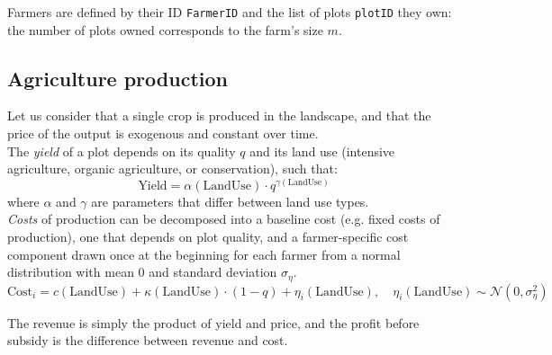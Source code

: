 \documentclass{article}
\begin{document}
\noindent Farmers are defined by their ID \texttt{FarmerID} and the list of plots \texttt{plotID} they own: the number of plots owned corresponds to the farm's size $m$. 

\subsection{Agriculture production}

Let us consider that a single crop is produced in the landscape, and that the price of the output is exogenous and constant over time. \\

\noindent The \emph{yield} of a plot depends on its quality $q$ and its land use (intensive agriculture, organic agriculture, or conservation), such that: 
\begin{equation}
    \text{Yield} = \alpha(\text{LandUse}) \cdot q^{\gamma(\text{LandUse})}
\end{equation}
where $\alpha$ and $\gamma$ are parameters that differ between land use types. \\

\noindent \emph{Costs} of production can be decomposed into a baseline cost (e.g. fixed costs of production), one that depends on plot quality, and a farmer-specific cost component drawn once at the beginning for each farmer from a normal distribution with mean $0$ and standard deviation $\sigma_{\eta}$.
\begin{equation}
    \text{Cost}_i = c(\text{LandUse}) + \kappa(\text{LandUse}) \cdot (1 - q) + \eta_i(\text{LandUse}), \quad \eta_i(\text{LandUse}) \sim \mathcal {N}(0,\sigma_\eta^2)
\end{equation}

\noindent The {revenue} is simply the product of yield and price, and the profit before subsidy is the difference between revenue and cost.
\end{document}
